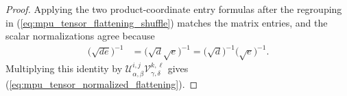 \begin{proof}\leanok
    Applying the two product-coordinate entry formulas after the regrouping in
    (\ref{eq:mpu_tensor_flattening_shuffle}) matches the matrix entries, and the scalar normalizations agree
    because
    \begin{align}
        \bigl(\sqrt{de}\bigr)^{-1}
         & =\bigl(\sqrt d\sqrt e\bigr)^{-1}
        =\bigl(\sqrt d\bigr)^{-1}\bigl(\sqrt e\bigr)^{-1}.
    \end{align}
    Multiplying this identity by
    $\mathcal U^{i,j}_{\alpha,\beta}
        \mathcal V^{k,\ell}_{\gamma,\delta}$ gives
    (\ref{eq:mpu_tensor_normalized_flattening}).
\end{proof}


